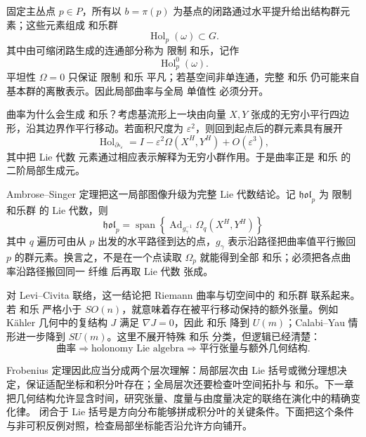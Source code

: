 固定主丛点 $p\in P$，所有以 $b=\pi(p)$ 为基点的闭路通过水平提升给出结构群元素；这些元素组成 和乐群
\[
\operatorname{Hol}_p(\omega)\subset G.
\]
其中由可缩闭路生成的连通部分称为 限制 和乐，记作
\[
\operatorname{Hol}_p^0(\omega).
\]
平坦性 $\Omega=0$ 只保证 限制 和乐 平凡；若基空间非单连通，完整 和乐 仍可能来自基本群的离散表示。因此局部曲率与全局 单值性 必须分开。

曲率为什么会生成 和乐？考虑基流形上一块由向量 $X,Y$ 张成的无穷小平行四边形，沿其边界作平行移动。若面积尺度为 $\varepsilon^2$，则回到起点后的群元素具有展开
\[
\operatorname{Hol}_{\partial\square_\varepsilon}
=I-\varepsilon^2\Omega(X^H,Y^H)+O(\varepsilon^3),
\]
其中把 Lie 代数 元素通过相应表示解释为无穷小群作用。于是曲率正是 和乐 的二阶局部生成元。

Ambrose--Singer 定理把这一局部图像升级为完整 Lie 代数结论。记 $\mathfrak{hol}_p$ 为 限制 和乐群 的 Lie 代数，则
\begin{equation*}\boxed{
\mathfrak{hol}_p
=\operatorname{span}
\left\{
\operatorname{Ad}_{g_\gamma^{-1}}
\Omega_q(X^H,Y^H)
\right\}
}\end{equation*}
其中 $q$ 遍历可由从 $p$ 出发的水平路径到达的点，$g_\gamma$ 表示沿路径把曲率值平行搬回 $p$ 的群元素。换言之，不是在一个点读取 $\Omega_p$ 就能得到全部 和乐；必须把各点曲率沿路径搬回同一 纤维 后再取 Lie 代数 张成。

对 Levi--Civita 联络，这一结论把 Riemann 曲率与切空间中的 和乐群 联系起来。若 和乐 严格小于 $SO(n)$，就意味着存在被平行移动保持的额外张量。例如 Kähler 几何中的复结构 $J$ 满足 $\nabla J=0$，因此 和乐 降到 $U(m)$；Calabi--Yau 情形进一步降到 $SU(m)$。这里不展开特殊 和乐 分类，但逻辑已经清楚：
\[
\text{曲率}
\Longrightarrow
\text{holonomy Lie algebra}
\Longrightarrow
\text{平行张量与额外几何结构}.
\]

Frobenius 定理因此应当分成两个层次理解：局部层次由 Lie 括号或微分理想决定，保证适配坐标和积分叶存在；全局层次还要检查叶空间拓扑与 和乐。下一章把几何结构允许显含时间，研究张量、度量与由度量决定的联络在演化中的精确变化律。
闭合于 Lie 括号是方向分布能够拼成积分叶的关键条件。下面把这个条件与非可积反例对照，检查局部坐标能否沿允许方向铺开。




